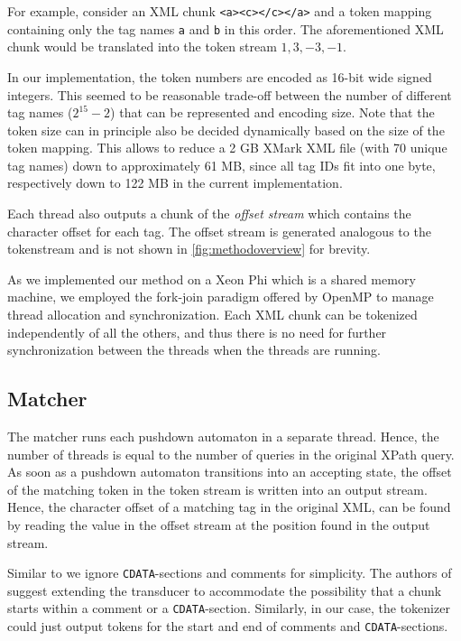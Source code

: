 For example, consider an XML chunk \verb;<a><c></c></a>; and a token mapping
containing only the tag names \verb;a; and \verb;b; in this order. The
aforementioned XML chunk would be translated into the token stream $1, 3, -3,
-1$.

In our implementation, the token numbers are encoded as 16-bit wide signed
integers. This seemed to be reasonable trade-off between the number of different
tag names ($2^{15}-2$) that can be represented and encoding size. Note that the
token size can in principle also be decided dynamically based on the size of the
token mapping. This allows to reduce a 2 GB XMark XML file (with 70 unique tag 
names) down to approximately 61 MB, since all tag IDs fit into one byte, respectively 
down to 122 MB in the current implementation.

Each thread also outputs a chunk of the \emph{offset stream} which contains the
character offset for each tag. The offset stream is generated analogous to the
tokenstream and is not shown in \ref{fig:methodoverview} for brevity.

As we implemented our method on a Xeon Phi which is a shared
memory machine, we employed the fork-join paradigm offered by OpenMP to manage
thread allocation and synchronization. Each XML chunk can be tokenized
independently of all the others, and thus there is no need for further
synchronization between the threads when the threads are running.

\subsection{Matcher}
The matcher runs each pushdown automaton in a separate thread. Hence, the
number of threads is equal to the number of queries in the original XPath
query. As soon as a pushdown automaton transitions into an accepting state,
the offset of the matching token in the token stream is written into an output
stream. Hence, the character offset of a matching tag in the original XML, can
be found by reading the value in the offset stream at the position found in the
output stream.

Similar to \cite{Ogden2013} we ignore \texttt{CDATA}-sections and comments for
simplicity. The authors of \cite{Ogden2013} suggest extending the transducer to
accommodate the possibility that a chunk starts within a comment or a
\texttt{CDATA}-section. Similarly, in our case, the tokenizer could just output
tokens for the start and end of comments and \texttt{CDATA}-sections.



